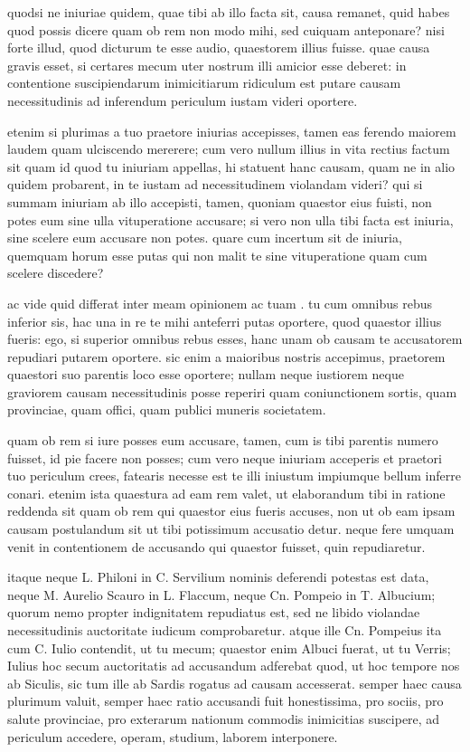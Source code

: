  quodsi ne iniuriae quidem, quae tibi ab illo facta sit, causa remanet, quid habes quod possis dicere quam ob rem non modo mihi, sed cuiquam anteponare? nisi forte illud, quod dicturum te esse audio, quaestorem illius fuisse. quae causa gravis esset, si certares mecum uter nostrum illi amicior esse deberet: in contentione suscipiendarum inimicitiarum ridiculum est putare causam necessitudinis ad inferendum periculum iustam videri oportere.

 etenim si plurimas a tuo praetore iniurias accepisses, tamen eas ferendo maiorem laudem quam ulciscendo mererere; cum vero nullum illius in vita rectius factum sit quam id quod tu iniuriam appellas, hi statuent hanc causam, quam ne in alio quidem probarent, in te iustam ad necessitudinem violandam videri? qui si summam iniuriam ab illo accepisti, tamen, quoniam quaestor eius fuisti, non potes eum sine ulla vituperatione accusare; si vero non ulla tibi facta est iniuria, sine scelere eum accusare non potes. quare cum incertum sit de iniuria, quemquam horum esse putas qui non malit te sine vituperatione quam cum scelere discedere?

 ac vide quid differat inter meam opinionem ac tuam . tu cum omnibus rebus inferior sis, hac una in re te mihi anteferri putas oportere, quod quaestor illius fueris: ego, si superior omnibus rebus esses, hanc unam ob causam te accusatorem repudiari putarem oportere. sic enim a maioribus nostris accepimus, praetorem quaestori suo parentis loco esse oportere; nullam neque iustiorem neque graviorem causam necessitudinis posse reperiri quam coniunctionem sortis, quam provinciae, quam offici, quam publici muneris societatem.

 quam ob rem si iure posses eum accusare, tamen, cum is tibi parentis numero fuisset, id pie facere non posses; cum vero neque iniuriam acceperis et praetori tuo periculum crees, fatearis necesse est te illi iniustum impiumque bellum inferre conari. etenim ista quaestura ad eam rem valet, ut elaborandum tibi in ratione reddenda sit quam ob rem qui quaestor eius fueris accuses, non ut ob eam ipsam causam postulandum sit ut tibi potissimum accusatio detur. neque fere umquam venit in contentionem de accusando qui quaestor fuisset, quin repudiaretur.

 itaque neque L. Philoni in C. Servilium nominis deferendi potestas est data, neque M. Aurelio Scauro in L. Flaccum, neque Cn. Pompeio in T. Albucium; quorum nemo propter indignitatem repudiatus est, sed ne libido violandae necessitudinis auctoritate iudicum comprobaretur. atque ille Cn. Pompeius ita cum C. Iulio contendit, ut tu mecum; quaestor enim Albuci fuerat, ut tu Verris; Iulius hoc secum auctoritatis ad accusandum adferebat quod, ut hoc tempore nos ab Siculis, sic tum ille ab Sardis rogatus ad causam accesserat. semper haec causa plurimum valuit, semper haec ratio accusandi fuit honestissima, pro sociis, pro salute provinciae, pro exterarum nationum commodis inimicitias suscipere, ad periculum accedere, operam, studium, laborem interponere.

